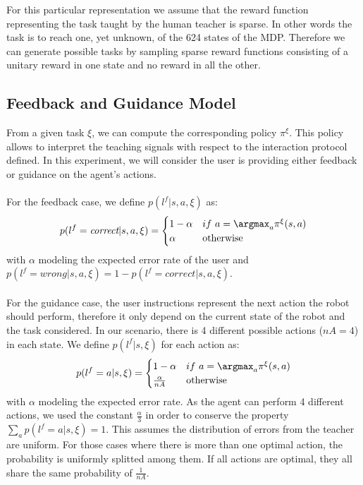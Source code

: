 For this particular representation we assume that the reward function representing the task taught by the human teacher is sparse. In other words the task is to reach one, yet unknown, of the 624 states of the MDP. Therefore we can generate possible tasks by sampling sparse reward functions consisting of a unitary reward in one state and no reward in all the other. 

\subsection{Feedback and Guidance Model}
\label{chapter:lfui:framemodels}

From a given task $\xi$, we can compute the corresponding policy $\pi^{\xi}$. This policy allows to interpret the teaching signals with respect to the interaction protocol defined. In this experiment, we will consider the user is providing either feedback or guidance on the agent's actions. 

\paragraph{} For the feedback case, we define $p(l^f |s,a,\xi)$ as:
%
\begin{equation}
    p(l^f = \emph{correct} |s,a,\xi) = 
    \begin{cases}
    1-\alpha               & if~a = \argmax_a \pi^{\xi}(s,a)\\
        \alpha             & \text{otherwise}\\
   \end{cases}
   \label{eq:feedbackframe}
\end{equation}
%
with $\alpha$ modeling the expected error rate of the user and $p(l^f = wrong |s,a,\xi) = 1 - p(l^f = correct |s,a,\xi)$.

\paragraph{} For the guidance case, the user instructions represent the next action the robot should perform, therefore it only depend on the current state of the robot and the task considered. In our scenario, there is 4 different possible actions ($nA = 4$) in each state. We define $p(l^f |s, \xi)$ for each action as:
%
\begin{equation}
    p(l^f = a |s,\xi) = 
    \begin{cases}
        1-\alpha & if~a = \argmax_a \pi^{\xi}(s,a)\\
        \frac{\alpha}{nA} & \text{otherwise}\\
   \end{cases}
   \label{eq:guidanceframe}
\end{equation}
%
with $\alpha$ modeling the expected error rate. As the agent can perform 4 different actions, we used the constant $\frac{\alpha}{3}$ in order to conserve the property $\sum_a p(l^f = a |s,\xi) = 1$. This assumes the distribution of errors from the teacher are uniform. For those cases where there is more than one optimal action, the probability is uniformly splitted among them. If all actions are optimal, they all share the same probability of $\frac{1}{nA}$.

